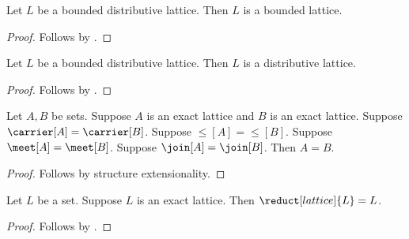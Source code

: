 \begin{proposition}\label{bounded_distributive_lattice_is_bounded_lattice}
    Let $L$ be a bounded distributive lattice.
    Then $L$ is a bounded lattice.
\end{proposition}
\begin{proof}
    Follows by .
\end{proof}

\begin{proposition}\label{bounded_distributive_lattice_is_distributive_lattice}
    Let $L$ be a bounded distributive lattice.
    Then $L$ is a distributive lattice.
\end{proposition}
\begin{proof}
    Follows by .
\end{proof}

\begin{theorem}\label{exact_lattice_extensionality}
    Let $A,B$ be sets.
    Suppose $A$ is an exact lattice and $B$ is an exact lattice.
    Suppose $\carrier[A]=\carrier[B]$.
    Suppose $\leq[A]=\leq[B]$.
    Suppose $\meet[A]=\meet[B]$.
    Suppose $\join[A]=\join[B]$.
    Then $A=B$.
\end{theorem}
\begin{proof}
    Follows by structure extensionality.
\end{proof}

\begin{theorem}\label{exact_lattice_reduct_eq}
    Let $L$ be a set.
    Suppose $L$ is an exact lattice.
    Then $\reduct[lattice]{L}=L$.
\end{theorem}
\begin{proof}
    Follows by .
\end{proof}

